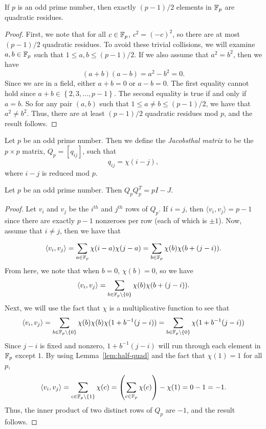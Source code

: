 \begin{lemma} \label{lem:half-quad}
 If $p$ is an odd prime number, then exactly $(p-1)/2$ elements in $\mathbb{F}_p$ are quadratic residues.

 \begin{proof}
  First, we note that for all $c \in \mathbb{F}_p$, $c^2 = (-c)^2$, so there are at most $(p-1)/2$ quadratic residues. To avoid these trivial collisions, we will examine $a,b \in \mathbb{F}_p$ such that $1 \leq a, b \leq (p-1)/2$. If we also assume that $a^2 = b^2$, then we have $$(a+b)(a-b) = a^2 - b^2 = 0.$$ Since we are in a field, either $a+b = 0$ or $a-b = 0$. The first equality cannot hold since $a+b \in \left\{2,3,\dots,p-1\right\}$. The second equality is true if and only if $a = b$. So for any pair $(a,b)$ such that $1 \leq a \neq b \leq (p-1)/{2}$, we have that $a^2 \neq b^2$. Thus, there are at least $(p-1)/{2}$ quadratic residues mod $p$, and the result follows.
 \end{proof}

\end{lemma}

\begin{definition} \label{def:jacobsthal}
 Let $p$ be an odd prime number. Then we define the {\it Jacobsthal matrix} to be the $p \times p$ matrix, $Q_p = [q_{ij}]$, such that $$q_{ij} = \chi(i-j),$$ where $i-j$ is reduced mod $p$.
\end{definition}

\begin{theorem} \label{th:qqt}
 Let $p$ be an odd prime number. Then $Q_pQ_p^T = pI - J$.
 \begin{proof}
  Let $v_i$ and $v_j$ be the $i^{th}$ and $j^{th}$ rows of $Q_p$. If $i = j$, then $\langle v_i,v_j\rangle = p-1$ since there are exactly $p-1$ nonzeroes per row (each of which is $\pm 1$). Now, assume that $i \neq j$, then we have that

  $$\langle v_i,v_j \rangle = \sum_{a \in \mathbb{F}_p} \chi(i-a)\chi(j-a) = \sum_{b \in \mathbb{F}_p} \chi(b)\chi(b+(j-i)).$$ From here, we note that when $b=0$, $\chi(b) = 0$, so we have $$\langle v_i,v_j \rangle = \sum_{b \in \mathbb{F}_p \setminus \{0\}} \chi(b)\chi(b+(j-i)).$$
  Next, we will use the fact that $\chi$ is a multiplicative function to see that 
  $$\langle v_i,v_j \rangle = \sum_{b \in \mathbb{F}_p \setminus \{0\}} \chi(b)\chi(b)\chi(1+b^{-1}(j-i)) = \sum_{b \in \mathbb{F}_p \setminus \{0\}} \chi(1+b^{-1}(j-i))$$
  Since $j-i$ is fixed and nonzero, $1+b^{-1}(j-i)$ will run through each element in $\mathbb{F}_p$ except $1$. By using Lemma~\ref{lem:half-quad} and the fact that $\chi(1) = 1$ for all $p$,
  $$\langle v_i,v_j \rangle = \sum_{c \in \mathbb{F}_p \setminus \{1\}} \chi(c) = \left(\sum_{c \in \mathbb{F}_p} \chi(c)\right) - \chi(1) = 0 - 1 = -1.$$
  Thus, the inner product of two distinct rows of $Q_p$ are $-1$, and the result follows.
 \end{proof}

\end{theorem}


